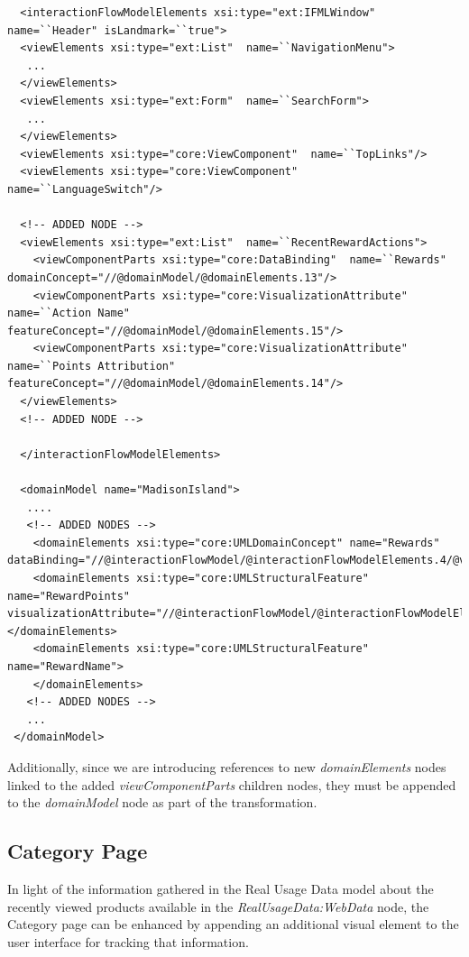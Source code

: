 \vspace{0.5cm}
\lstset{language=XML}
\begin{lstlisting} 
  <interactionFlowModelElements xsi:type="ext:IFMLWindow"  name=``Header" isLandmark=``true">
  <viewElements xsi:type="ext:List"  name=``NavigationMenu">
   ...
  </viewElements>
  <viewElements xsi:type="ext:Form"  name=``SearchForm">
   ...
  </viewElements>
  <viewElements xsi:type="core:ViewComponent"  name=``TopLinks"/>
  <viewElements xsi:type="core:ViewComponent"  name=``LanguageSwitch"/>

  <!-- ADDED NODE -->
  <viewElements xsi:type="ext:List"  name=``RecentRewardActions">
    <viewComponentParts xsi:type="core:DataBinding"  name=``Rewards" domainConcept="//@domainModel/@domainElements.13"/>
    <viewComponentParts xsi:type="core:VisualizationAttribute"  name=``Action Name" featureConcept="//@domainModel/@domainElements.15"/>
    <viewComponentParts xsi:type="core:VisualizationAttribute"  name=``Points Attribution" featureConcept="//@domainModel/@domainElements.14"/>
  </viewElements>
  <!-- ADDED NODE -->

  </interactionFlowModelElements>

  <domainModel name="MadisonIsland">
   ....
   <!-- ADDED NODES -->
    <domainElements xsi:type="core:UMLDomainConcept" name="Rewards" dataBinding="//@interactionFlowModel/@interactionFlowModelElements.4/@viewElements.4/@viewComponentParts.0"/>
    <domainElements xsi:type="core:UMLStructuralFeature"  name="RewardPoints" visualizationAttribute="//@interactionFlowModel/@interactionFlowModelElements.4/@viewElements.4/@viewComponentParts.2"></domainElements>
    <domainElements xsi:type="core:UMLStructuralFeature"  name="RewardName">
    </domainElements>
   <!-- ADDED NODES -->
   ...
 </domainModel>
\end{lstlisting}
\vspace{0.5cm}

Additionally, since we are introducing references to new \textit{domainElements} nodes linked to the added \textit{viewComponentParts} children nodes, they must be appended to the \textit{domainModel} node as part of the transformation.

\subsection{Category Page}
\label{category-page-updates}

In light of the information gathered in the Real Usage Data model about the recently viewed products available in the \textit{RealUsageData:WebData} node, the Category page can be enhanced by appending an additional visual element to the user interface for tracking that information.

